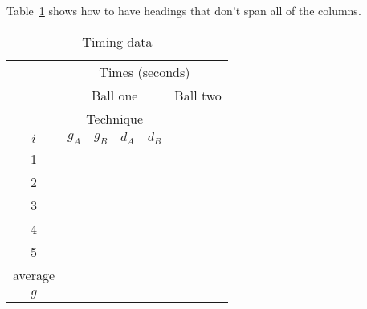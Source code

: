 \documentclass{article}
\begin{document}
Table~{\ref{tab:ngdata}} shows how to have headings
that don't span all of the columns.
\begin{table}[ht!]
\begin{center}
\begin{tabular}{|c|p{1cm}|p{1cm}|p{1cm}|p{1cm}|p{1.5cm}|} \hline
&\multicolumn{5}{|c|}{Times (seconds)} \\ \cline{2-6}
&\multicolumn{4}{|c|}{Ball one}& Ball two \\ \cline{2-5}
&\multicolumn{4}{|c|}{Technique} &\\ \cline{2-5}
$i$ & $g_A$  & $g_B$ & $d_A$ & $d_B$ & \\ \hline \hline
1 & & & & &   \\
2 & & & & &   \\
3 & & & & &   \\
4 & & & & &   \\
5 & & & & &   \\
\hline \hline

average& & & & &  \\
\hline
$g$ & & & & &  \\
\hline
\end{tabular}
\end{center}
\caption {Timing data}
\label{tab:ngdata}
\end{table}
\end{document}
